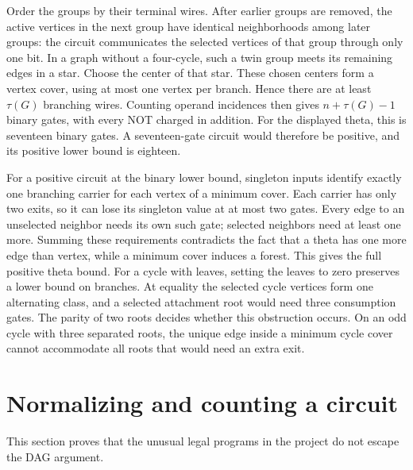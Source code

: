 \documentclass[11pt]{article}
\theoremstyle{definition}
\theoremstyle{remark}
\begin{document}
Order the groups by their terminal wires. After earlier groups are removed,
the active vertices in the next group have identical neighborhoods among
later groups: the circuit communicates the selected vertices of that group
through only one bit. In a graph without a four-cycle, such a twin group
meets its remaining edges in a star. Choose the center of that star. These
chosen centers form a vertex cover, using at most one vertex per branch.
Hence there are at least $\tau(G)$ branching wires. Counting operand
incidences then gives $n+\tau(G)-1$ binary gates, with every NOT charged in
addition. For the displayed theta, this is seventeen binary gates. A
seventeen-gate circuit would therefore be positive, and its positive
lower bound is eighteen.

For a positive circuit at the binary lower bound, singleton inputs identify
exactly one branching carrier for each vertex of a minimum cover. Each
carrier has only two exits, so it can lose its singleton value at at most
two gates. Every edge to an unselected neighbor needs its own such gate;
selected neighbors need at least one more. Summing these requirements
contradicts the fact that a theta has one more edge than vertex, while a
minimum cover induces a forest. This gives the full positive theta bound.
For a cycle with leaves, setting the leaves to zero preserves a lower bound
on branches. At equality the selected cycle vertices form one alternating
class, and a selected attachment root would need three consumption gates.
The parity of two roots decides whether this obstruction occurs. On an
odd cycle with three separated roots, the unique edge inside a minimum
cycle cover cannot accommodate all roots that would need an extra exit.

\section{Normalizing and counting a circuit}

This section proves that the unusual legal programs in the project do not
escape the DAG argument.
\end{document}
